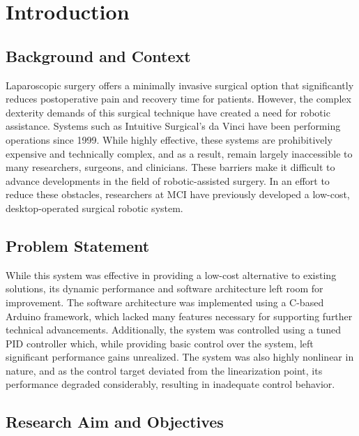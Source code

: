 \chapter{Introduction}


\section{Background and Context}
\label{section:background}

Laparoscopic surgery offers a minimally invasive surgical option that significantly reduces postoperative pain and recovery time for patients. However, the complex dexterity demands of this surgical technique have created a need for robotic assistance. Systems such as Intuitive Surgical’s da Vinci have been performing operations since 1999. While highly effective, these systems are prohibitively expensive and technically complex, and as a result, remain largely inaccessible to many researchers, surgeons, and clinicians. These barriers make it difficult to advance developments in the field of robotic-assisted surgery. In an effort to reduce these obstacles, researchers at MCI have previously developed a low-cost, desktop-operated surgical robotic system.

\section{Problem Statement}
\label{section:problem_statement}

While this system was effective in providing a low-cost alternative to existing solutions, its dynamic performance and software architecture left room for improvement. The software architecture was implemented using a C-based Arduino framework, which lacked many features necessary for supporting further technical advancements. Additionally, the system was controlled using a tuned PID controller which, while providing basic control over the system, left significant performance gains unrealized. The system was also highly nonlinear in nature, and as the control target deviated from the linearization point, its performance degraded considerably, resulting in inadequate control behavior.

\section{Research Aim and Objectives}
\label{section:objectives}

